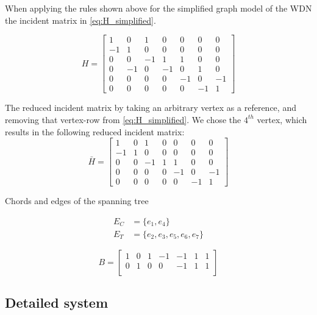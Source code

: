 When applying the rules shown above for the simplified graph model of the WDN the incident matrix in \cref{eq:H_simplified}.

\begin{equation}
	H = \begin{bmatrix}
		1 & 0 & 1 & 0 & 0 & 0 & 0\\
		-1 & 1 & 0 & 0 & 0 & 0 & 0\\
		0 & 0 & -1 & 1 & 1 & 0 & 0\\
		0 & -1 & 0 & -1 & 0 & 1 & 0\\
		0 & 0 & 0 & 0 & -1 &  0  & -1\\
		0 & 0 & 0 & 0 & 0 & -1 & 1
	\end{bmatrix}
	\label{eq:H_simplified}
\end{equation} %


The reduced incident matrix by taking an arbitrary vertex as a reference, and removing that vertex-row from \cref{eq:H_simplified}. We chose the $4^{th}$ vertex, which results in the following reduced incident matrix:
\begin{equation}
	\bar{H} = \begin{bmatrix}
		1 & 0 & 1 & 0 & 0 & 0 & 0\\
		-1 & 1 & 0 & 0 & 0 & 0 & 0\\
		0 & 0 & -1 & 1 & 1 & 0 & 0\\
		0 & 0 & 0 & 0 & -1 &  0  & -1\\
		0 & 0 & 0 & 0 & 0 & -1 & 1
	\end{bmatrix}
\end{equation}

Chords and edges of the spanning tree

\begin{equation*} 
	\begin{split}
		E_{C} &= \{e_{1},e_{4}\}   \\ E_{T} &= \{e_2,e_3,e_5,e_6,e_7\}
	\end{split}
\end{equation*}


\begin{equation}
	B = \begin{bmatrix}
		1 & 0 & 1 & -1 & -1 & 1 & 1\\
		0 & 1 & 0 & 0 & -1 & 1 & 1\\
	\end{bmatrix}
\end{equation}
\newpage

\subsection{Detailed system}

